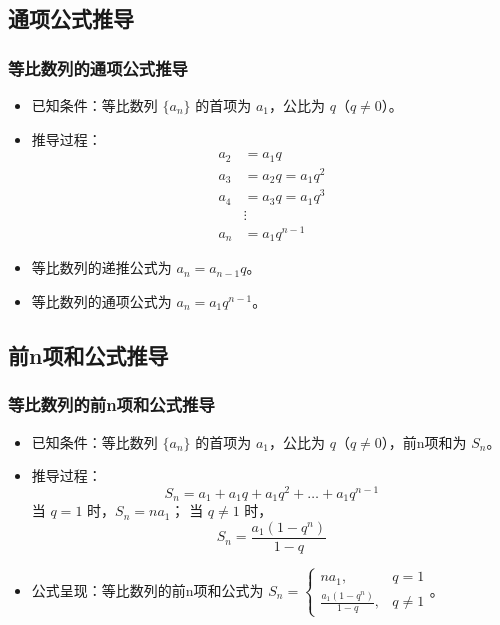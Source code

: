 \documentclass{ctexbeamer}
\begin{document}
\subsection{通项公式推导}
\begin{frame}[t]
\frametitle{等比数列的通项公式推导}
\begin{itemize}
    \item 已知条件：等比数列 $\{a_n\}$ 的首项为 $a_1$，公比为 $q$（$q \neq 0$）。
    \item 推导过程：
        \begin{align*}
            a_2 &= a_1q \\
            a_3 &= a_2q = a_1q^2 \\
            a_4 &= a_3q = a_1q^3 \\
            &\vdots \\
            a_n &= a_1q^{n-1}
        \end{align*}
    \item 等比数列的递推公式为 $a_n = a_{n-1}q$。
    \item 等比数列的通项公式为 $a_n = a_1q^{n-1}$。
\end{itemize}
\end{frame}

\subsection{前n项和公式推导}
\begin{frame}[t]
\frametitle{等比数列的前n项和公式推导}
\begin{itemize}
    \item 已知条件：等比数列 $\{a_n\}$ 的首项为 $a_1$，公比为 $q$（$q \neq 0$），前n项和为 $S_n$。
    \item 推导过程：
        \[
            S_n = a_1 + a_1q + a_1q^2 + \ldots + a_1q^{n-1}
        \]
        当 $q = 1$ 时，$S_n = na_1$；
        当 $q \neq 1$ 时，
        \[
            S_n = \frac{a_1(1 - q^n)}{1 - q}
        \]
    \item 公式呈现：等比数列的前n项和公式为 $S_n = \begin{cases}
        na_1, & q = 1 \\
        \frac{a_1(1 - q^n)}{1 - q}, & q \neq 1
    \end{cases}$。
\end{itemize}
\end{frame}
\end{document}
